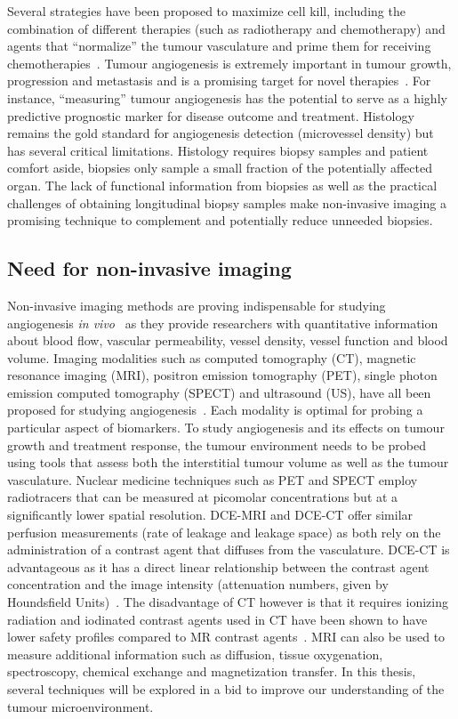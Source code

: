 Several strategies have been proposed to maximize cell kill, including the combination of different therapies (such as radiotherapy and chemotherapy) and agents that ``normalize'' the tumour vasculature and prime them for receiving chemotherapies~\cite{Jain:2005gk}.
Tumour angiogenesis is extremely important in tumour growth, progression and metastasis and is a promising target for novel therapies~\cite{Miles:2000wq}.
For instance, ``measuring'' tumour angiogenesis has the potential to serve as a highly predictive prognostic marker for disease outcome and treatment.
Histology remains the gold standard for angiogenesis detection (microvessel density) but has several critical limitations.
Histology requires biopsy samples and patient comfort aside, biopsies only sample a small fraction of the potentially affected organ.
The lack of functional information from biopsies as well as the practical challenges of obtaining longitudinal biopsy samples make non-invasive imaging a promising technique to complement and potentially reduce unneeded biopsies.

\subsection{Need for non-invasive imaging}
Non-invasive imaging methods are proving indispensable for studying angiogenesis \emph{in vivo}~\cite{McDonald:2003cm} as they provide researchers with quantitative information about blood flow, vascular permeability, vessel density, vessel function and blood volume.
 Imaging modalities such as computed tomography (CT), magnetic resonance imaging (MRI), positron emission tomography (PET), single photon emission computed tomography (SPECT) and ultrasound (US), have all been proposed for studying angiogenesis~\cite{Laking:2006}.
Each modality is optimal for probing a particular aspect of biomarkers. To study angiogenesis and its effects on tumour growth and treatment response, the tumour environment needs to be probed using tools that assess both the interstitial tumour volume as well as the tumour vasculature.
Nuclear medicine techniques such as PET and SPECT employ radiotracers that can be measured at picomolar concentrations but at a significantly lower spatial resolution.
DCE-MRI and DCE-CT offer similar perfusion measurements (rate of leakage and leakage space) as both rely on the administration of a contrast agent that diffuses from the vasculature.
DCE-CT is advantageous as it has a direct linear relationship between the contrast agent concentration and the image intensity (attenuation numbers, given by Houndsfield Units)~\cite{Cuenod:2006jy}.
The disadvantage of CT however is that it requires ionizing radiation and iodinated contrast agents used in CT have been shown to have lower safety profiles compared to MR contrast agents~\cite{Hasebroock:2009hw}.
MRI can also be used to measure additional information such as diffusion, tissue oxygenation, spectroscopy, chemical exchange and magnetization transfer. 
In this thesis, several techniques will be explored in a bid to improve our understanding of the tumour microenvironment.

